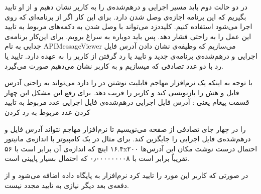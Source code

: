 در دو حالت دوم باید مسیر اجرایی و درهم‌شده‌ی را به کاربر نشان دهیم و از او تایید بگیریم که این برنامه اجازه‌ی وصل شدن دارد. برای این کار اگر از برنامه‌ای که روی  اجرا می‌شود استفاده کنیم. کلیددزد می‌تواند با وصل شدن به  دکمه‌های مربوط به تایید این عمل را به راحتی فشار دهد. پس باید دوباره به سراغ  برویم. برای این‌کار برنامه‌ی جدایی به نام APIMessageViewer می‌سازیم که وظیفه‌ی نشان دادن آدرس فایل اجرایی و درهم‌شده‌ی برنامه‌ی جدید و تایید یا رد گرفتن از کاربر را به عهده دارد. تایید یا رد با دو عدد تصادفی که میسازیم و به کاربر نشان می‌دهیم صورت می‌گیرد. 

با توجه به اینکه یک نرم‌افزار مهاجم قابلیت نوشتن در  را دارد می‌تواند به راحتی آدرس فایل و هش را بازنویسی کند و کاربر را فریب دهد. برای رفع این مشکل این چهار قسمت پیغام یعنی :
 آدرس فایل اجرایی
 درهم‌شده‌ی فایل اجرایی
 عدد مربوط به تایید کردن
 عدد مربوط به رد کردن

را در چهار جای تصادفی از صفحه می‌نویسیم تا نرم‌افزار مهاجم نتواند آدرس فایل و درهم‌شده‌ی فایل اجرایی را جایگزین کند. برای مثال در یک کامپیوتر با اندازه‌ی مانیتور ۱۶.۴ اینچ که اندازه‌ی  آن برابر است با ۵۶x۲۰۰ احتمال درست نوشت مکان این آدرس‌ها تقریباً برابر است با ۰٫۰۰۰۰۰۰۰۰۸ که احتمال بسیار پایینی است.

در صورتی که کاربر این مورد را تایید کرد نرم‌افزار به پایگاه داده اضافه می‌شود و از دفعه‌ی بعد دیگر نیازی به تایید مجدد نیست.

